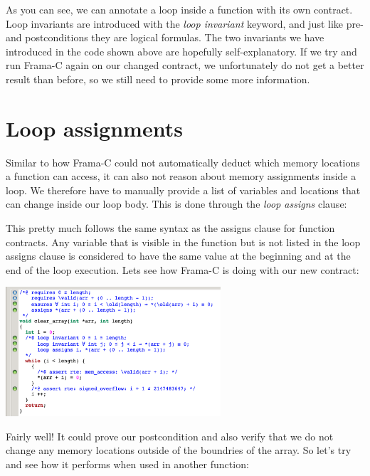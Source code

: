 
As you can see, we can annotate a loop inside a function with its own contract. Loop invariants are introduced with the \emph{loop invariant} keyword, and just like pre- and postconditions they are logical formulas. The two invariants we have introduced in the code shown above are hopefully self-explanatory. If we try and run Frama-C again on our changed contract, we unfortunately do not get a better result than before, so we still need to provide some more information. 

\section{Loop assignments}

Similar to how Frama-C could not automatically deduct which memory locations a function can access, it can also not reason about memory assignments inside a loop. We therefore have to manually provide a list of variables and locations that can change inside our loop body. This is done through the \emph{loop assigns} clause:


This pretty much follows the same syntax as the assigns clause for function contracts. Any variable that is visible in the function but is not listed in the loop assigns clause is considered to have the same value at the beginning and at the end of the loop execution. Lets see how Frama-C is doing with our new contract:

\begin{center}
    \includegraphics[width=0.6\textwidth]{images/frama_c_clear_array_assigns.png}
\end{center}

Fairly well! It could prove our postcondition and also verify that we do not change any memory locations outside of the boundries of the array. So let's try and see how it performs when used in another function: 

